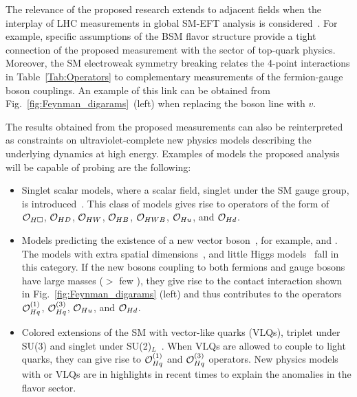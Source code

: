 \documentclass[a4paper,11pt]{article}
\begin{document}
The relevance of the proposed research extends to adjacent fields when the interplay of LHC measurements in global SM-EFT analysis is considered~\cite{Ellis:2018gqa,Ethier:2021bye}.
For example, specific assumptions of the BSM flavor structure provide a tight connection of the proposed measurement with the sector of top-quark physics. 
Moreover, the SM electroweak symmetry breaking relates the 4-point interactions in Table~\ref{Tab:Operators} to complementary measurements of the fermion-gauge boson couplings. 
An example of this link can be obtained from Fig.~\ref{fig:Feynman_digarams}~(left) when replacing the \PH boson line with $v$.

The results obtained from the proposed measurements can also be reinterpreted as constraints on ultraviolet-complete new physics models describing the underlying dynamics at high energy.
Examples of models the proposed analysis will be capable of probing are the following:
\begin{itemize}

\item Singlet scalar models, where a scalar field, singlet under the SM gauge group, is introduced~\cite{deBlas:2014mba,Profumo:2014opa}. This class of models gives rise to operators of the form of ${\cal O}_{H\square}$, ${\cal O}_{HD}$, ${\cal O}_{HW}$, ${\cal O}_{HB}$, ${\cal O}_{HWB}$, ${\cal O}_{Hu}$, and ${\cal O}_{Hd}$.

\item Models predicting the existence of a new vector boson~\cite{delAguila:2010mx}, for example, \PZprime and \PWprime. 
The models with extra spatial dimensions~\cite{Burdman:2006gy}, and little Higgs models~\cite{PhysRevD.10.275} fall in this category.
If the new bosons coupling to both fermions and gauge bosons have large masses ($>$ few \TeV), they give rise to the contact interaction shown in Fig.~\ref{fig:Feynman_digarams} (left) and thus contributes to the operators  ${\cal O}^{(1)}_{Hq}$, ${\cal O}^{(3)}_{Hq}$, ${\cal O}_{Hu}$, and ${\cal O}_{Hd}$. 

\item Colored extensions of the SM with vector-like quarks (VLQs), triplet under SU(3) and singlet under SU(2)$_L$~\cite{delAguila:2000aa,Dawson:2012di}. 
When VLQs are allowed to couple to light quarks, they can give rise to ${\cal O}^{(1)}_{Hq}$ and ${\cal O}^{(3)}_{Hq}$ operators.
New physics models with \PZprime or VLQs are in highlights in recent times to explain the anomalies in the flavor sector. 

\end{itemize}
\end{document}
